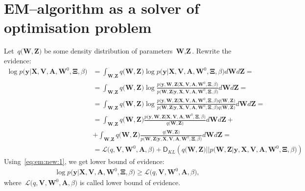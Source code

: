 \documentclass[12pt, twoside]{article}
\numberwithin{equation}{section}
\begin{document}
\section{EM--algorithm as a solver of optimisation problem}
Let~$q\bigr(\textbf{W}, \textbf{Z}\bigr)$ be some density distribution of parameters~$\textbf{W}, \textbf{Z}$. Rewrite the evidence:
\[
\label{eq:em:new:1}
\begin{aligned}
\log p\bigr(\mathbf{y}|\mathbf{X}, \mathbf{V}, \textbf{A}, \textbf{W}^{0}, \bm{\Xi}, \beta\bigr) &= \int_{\textbf{W}, \textbf{Z}} q\bigr(\textbf{W}, \textbf{Z}\bigr) \log p\bigr(\mathbf{y}|\mathbf{X}, \mathbf{V}, \textbf{A}, \textbf{W}^{0}, \bm{\Xi}, \beta\bigr)d\textbf{W}d\textbf{Z} =\\
&= \int_{\textbf{W}, \textbf{Z}} q\bigr(\textbf{W}, \textbf{Z}\bigr)\log \frac{p\bigr(\mathbf{y}, \textbf{W}, \textbf{Z}|\mathbf{X}, \mathbf{V}, \textbf{A}, \textbf{W}^{0}, \bm{\Xi}, \beta\bigr)}{p\bigr(\textbf{W}, \textbf{Z}|\mathbf{y}, \mathbf{X}, \mathbf{V}, \textbf{A}, \textbf{W}^{0}, \bm{\Xi}, \beta\bigr)}d\textbf{W}d\textbf{Z}=\\
&= \int_{\textbf{W}, \textbf{Z}} q\bigr(\textbf{W}, \textbf{Z}\bigr)\log \frac{p\bigr(\mathbf{y}, \textbf{W}, \textbf{Z}|\mathbf{X}, \mathbf{V}, \textbf{A}, \textbf{W}^{0}, \bm{\Xi}, \beta\bigr)q\bigr(\textbf{W}, \textbf{Z}\bigr)}{p\bigr(\textbf{W}, \textbf{Z}|\mathbf{y}, \mathbf{X}, \mathbf{V}, \textbf{A}, \textbf{W}^{0}, \bm{\Xi}, \beta\bigr)q\bigr(\textbf{W}, \textbf{Z}\bigr)}d\textbf{W}d\textbf{Z}=\\
&= \int_{\textbf{W}, \textbf{Z}} q\bigr(\textbf{W}, \textbf{Z}\bigr)\frac{p\bigr(\mathbf{y}, \textbf{W}, \textbf{Z}|\mathbf{X}, \mathbf{V}, \textbf{A}, \textbf{W}^{0}, \bm{\Xi}, \beta\bigr)}{q\bigr(\textbf{W}, \textbf{Z}\bigr)}d\textbf{W}d\textbf{Z}+\\
&+\int_{\textbf{W}, \textbf{Z}} q\bigr(\textbf{W}, \textbf{Z}\bigr)\frac{q\bigr(\textbf{W}, \textbf{Z}\bigr)}{p\bigr(\textbf{W}, \textbf{Z}|\mathbf{y}, \mathbf{X}, \mathbf{V}, \textbf{A}, \textbf{W}^{0}, \bm{\Xi}, \beta\bigr)}d\textbf{W}d\textbf{Z}=\\
&=\mathcal{L}\bigr(q, \textbf{V}, \textbf{W}^{0}, \textbf{A}, \beta\bigr)+\mathsf{D}_{KL}\left(q\bigr(\textbf{W}, \textbf{Z}\bigr)||p\bigr(\textbf{W}, \textbf{Z}|\mathbf{y}, \mathbf{X}, \mathbf{V}, \textbf{A}, \textbf{W}^{0}, \bm{\Xi}, \beta\bigr)\right)
\end{aligned}
\]
Using~\eqref{eq:em:new:1}, we get lower bound of evidence:
\[
\label{eq:em:new:2}
\begin{aligned}
\log p\bigr(\mathbf{y}|\mathbf{X}, \mathbf{V}, \textbf{A}, \textbf{W}^{0}, \bm{\Xi}, \beta\bigr)\geq \mathcal{L}\bigr(q, \textbf{V}, \textbf{W}^{0}, \textbf{A}, \beta\bigr),
\end{aligned}
\]
where~$\mathcal{L}\bigr(q, \textbf{V}, \textbf{W}^{0}, \textbf{A}, \beta\bigr)$ is called lower bound of evidence.
\end{document}
